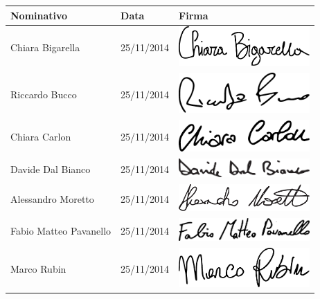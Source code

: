 	\begin{center}
	\begin{tabular}{ | p{4cm} | p{2.5cm} | p{5cm} |}
	\hline
     Nominativo & Data & Firma \\ \hline
     Chiara Bigarella & 25/11/2014 & \includegraphics[width=5cm]{Commons/Pics/Signatures/Bigarella.pdf}  \\ \hline
     Riccardo Bucco & 25/11/2014 & \includegraphics[width=5cm]{Commons/Pics/Signatures/Bucco.pdf}\\ \hline
     Chiara Carlon & 25/11/2014 & \includegraphics[width=5cm]{Commons/Pics/Signatures/Carlon.pdf}\\ \hline
     Davide Dal Bianco & 25/11/2014 &\includegraphics[width=5cm]{Commons/Pics/Signatures/DalBianco.pdf} \\ \hline
     Alessandro Moretto & 25/11/2014 &\includegraphics[width=5cm]{Commons/Pics/Signatures/Moretto.pdf} \\ \hline
     Fabio Matteo Pavanello & 25/11/2014 & \includegraphics[width=5cm]{Commons/Pics/Signatures/Pavanello.pdf}\\ \hline
     Marco Rubin & 25/11/2014 &\includegraphics[width=5cm]{Commons/Pics/Signatures/Rubin.pdf} \\ \hline
     \end{tabular}
	\end{center}
